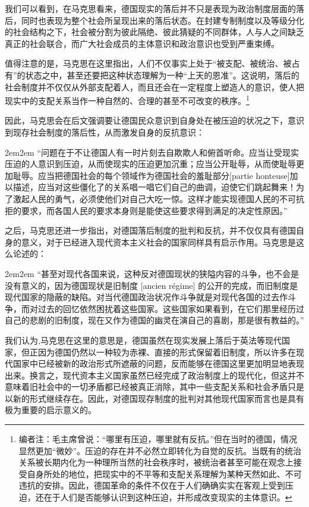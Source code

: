 \documentclass[a4paper,twoside,12pt,AutoFakeBold]{ctexart}
\begin{document}
我们可以看到，在马克思看来，德国现实的落后并不只是表现为政治制度层面的落后，同时也表现为整个社会所呈现出来的落后状态。在封建专制制度以及等级分化的社会结构之下，社会被分割为彼此隔绝、彼此猜疑的不同群体，人与人之间缺乏真正的社会联合，而广大社会成员的主体意识和政治意识也受到严重束缚。

值得注意的是，马克思在这里指出，人们不仅事实上处于“被支配、被统治、被占有”的状态之中，甚至还要把这种状态理解为一种“上天的恩准”。这说明，落后的社会制度并不仅仅从外部支配着人，而且还会在一定程度上塑造人的意识，使人把现实中的支配关系当作一种自然的、合理的甚至不可改变的秩序。\footnote{编者注：毛主席曾说：“哪里有压迫，哪里就有反抗。”但在当时的德国，情况显然更加“微妙”。压迫的存在并不必然立即转化为自觉的反抗。当既有的统治关系被长期内化为一种理所当然的社会秩序时，被统治者甚至可能在观念上接受自身所处的地位，把现实中的不平等和支配关系理解为某种天然如此、不可违抗的安排。因此，德国革命的条件不仅在于人们确确实实在客观上受到压迫，还在于人们是否能够认识到这种压迫，并形成改变现实的主体意识。}

因此，马克思会在后文强调要让德国民众意识到自身处在被压迫的状况之下，意识到现存社会制度的落后性，从而激发自身的反抗意识：

\begin{adjustwidth}{2em}{2em}
\qquad\fangsong
“问题在于不让德国人有一时片刻去自欺欺人和俯首听命。应当让受现实压迫的人意识到压迫，从而使现实的压迫更加沉重；应当公开耻辱，从而使耻辱更加耻辱。应当把德国社会的每个领域作为德国社会的羞耻部分[partie honteuse]加以描述，应当对这些僵化了的关系唱一唱它们自己的曲调，迫使它们跳起舞来！为了激起人民的勇气，必须使他们对自己大吃一惊。这样才能实现德国人民的不可抗拒的要求，而各国人民的要求本身则是能使这些要求得到满足的决定性原因。”
\end{adjustwidth}

之后，马克思还进一步指出，对德国落后制度的批判和反抗，并不仅仅具有德国自身的意义，对于已经进入现代资本主义社会的国家同样具有启示作用。马克思是这么论述的：

\begin{adjustwidth}{2em}{2em}
\qquad\fangsong
“甚至对现代各国来说，这种反对德国现状的狭隘内容的斗争，也不会是没有意义的，因为德国现状是旧制度 [ancien régime] 的公开的完成，而旧制度是现代国家的隐蔽的缺陷。对当代德国政治状况作斗争就是对现代各国的过去作斗争，而对过去的回忆依然困扰着这些国家。这些国家如果看到，在它们那里经历过自己的悲剧的旧制度，现在又作为德国的幽灵在演自己的喜剧，那是很有教益的。”
\end{adjustwidth}

我们认为,马克思在这里的意思是，德国虽然在现实发展上落后于英法等现代国家，但正因为德国仍然以一种较为赤裸、直接的形式保留着旧制度，所以许多在现代国家中已经被新的政治形式所遮蔽的问题，反而能够在德国这里更加明显地表现出来。换言之，现代资本主义国家虽然已经完成了政治制度上的现代化，但这并不意味着旧社会中的一切矛盾都已经被真正消除，其中一些支配关系和社会矛盾只是以新的形式继续存在。因此，对德国现存制度的批判对其他现代国家而言也是具有极为重要的启示意义的。
\end{document}

